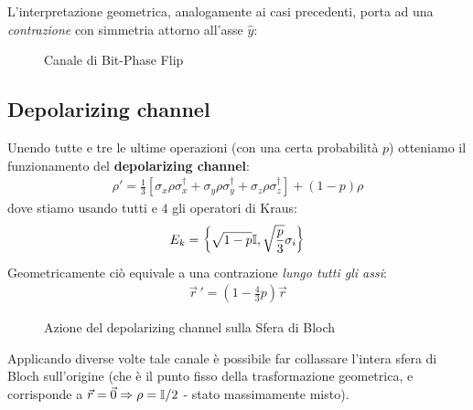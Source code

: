 \documentclass[../../InformazioneQuantistica.tex]{subfiles}
\begin{document}
L'interpretazione geometrica, analogamente ai casi precedenti, porta ad una \textit{contrazione} con simmetria attorno all'asse $\hat{y}$:
\begin{figure}[H]
    \centering
    
    \caption{Canale di Bit-Phase Flip}
    \label{fig:bit-phase-flip}
\end{figure}

\subsection{Depolarizing channel}
Unendo tutte e tre le ultime operazioni (con una certa probabilità $p$) otteniamo il funzionamento del \textbf{depolarizing channel}:
\begin{align*}
\rho' = \frac{1}{3}[\sigma_x \rho \sigma_x^\dag + \sigma_y \rho \sigma_y^\dag + \sigma_z\rho \sigma_z^\dag ] + (1-p)\rho
\end{align*}
dove stiamo usando tutti e $4$ gli operatori di Kraus:
\begin{align*}
E_k = \left\{\sqrt{1-p}\mathbb{I}, \sqrt{\frac{p}{3}}\sigma_i\right\}
\end{align*}
Geometricamente ciò equivale a una contrazione \textit{lungo tutti gli assi}:
\begin{align*}
\vec{r}\,' = \left(1-\frac{4}{3}p\right)\vec{r}
\end{align*}
\begin{figure}[H]
\centering

\caption{Azione del depolarizing channel sulla Sfera di Bloch\label{fig:depolarizing-geom}}
\end{figure}

Applicando diverse volte tale canale è possibile far collassare l'intera sfera di Bloch sull'origine (che è il punto fisso della trasformazione geometrica, e corrisponde a $\vec{r}=\vec{0}\Rightarrow \rho=\mathbb{I}/2$ - stato massimamente misto).
\end{document}
